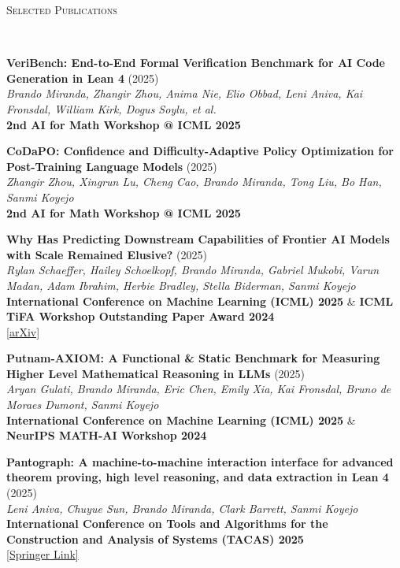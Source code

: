 \documentclass{article}
\newenvironment{changemargin}[2]{%
  \begin{list}{}{%
    \setlength{\topsep}{0pt}%
    \setlength{\leftmargin}{#1}%
    \setlength{\rightmargin}{#2}%
    \setlength{\listparindent}{\parindent}%
    \setlength{\itemindent}{\parindent}%
    \setlength{\parsep}{\parskip}%
  }%
  \item[]}{\end{list}
}
\newcommand{\lineover}{
	\begin{changemargin}{-0.05in}{-0.05in}
		\vspace*{-8pt}
		\hrulefill \\
		\vspace*{-2pt}
	\end{changemargin}
}
\newcommand{\header}[1]{
	\begin{changemargin}{-0.5in}{-0.5in}
		\scshape{#1}\\
  	\lineover
	\end{changemargin}
}
\newenvironment{body} {
	\vspace*{-16pt}
	\begin{changemargin}{-0.25in}{-0.5in}
  }	
	{\end{changemargin}
}
\begin{document}
\header{Selected Publications}
\begin{body}
    \vspace{4pt} %
    
    \vspace{10pt}
    \textbf{VeriBench: End-to-End Formal Verification Benchmark for AI Code Generation in Lean 4} (2025)\\
    \emph{Brando Miranda, Zhangir Zhou, Anima Nie, Elio Obbad, Leni Aniva, Kai Fronsdal, William Kirk, Dogus Soylu, et al.}\\
    \textbf{2nd AI for Math Workshop @ ICML 2025}

    \vspace{10pt}
    \textbf{CoDaPO: Confidence and Difficulty-Adaptive Policy Optimization for Post-Training Language Models} (2025)\\
    \emph{Zhangir Zhou, Xingrun Lu, Cheng Cao, Brando Miranda, Tong Liu, Bo Han, Sanmi Koyejo}\\
    \textbf{2nd AI for Math Workshop @ ICML 2025}

    \vspace{10pt}
    \textbf{Why Has Predicting Downstream Capabilities of Frontier AI Models with Scale Remained Elusive?} (2025)\\
    \emph{Rylan Schaeffer, Hailey Schoelkopf, Brando Miranda, Gabriel Mukobi, Varun Madan, Adam Ibrahim, Herbie Bradley, Stella Biderman, Sanmi Koyejo}\\
    \textbf{International Conference on Machine Learning (ICML) 2025} \& \textbf{ICML TiFA Workshop Outstanding Paper Award 2024}\\
    \href{https://arxiv.org/pdf/2406.04391}{[arXiv]}

    \vspace{10pt}
    \textbf{Putnam-AXIOM: A Functional \& Static Benchmark for Measuring Higher Level Mathematical Reasoning in LLMs} (2025)\\
    \emph{Aryan Gulati, Brando Miranda, Eric Chen, Emily Xia, Kai Fronsdal, Bruno de Moraes Dumont, Sanmi Koyejo}\\
    \textbf{International Conference on Machine Learning (ICML) 2025} \& \textbf{NeurIPS MATH-AI Workshop 2024}

    \vspace{10pt}
    \textbf{Pantograph: A machine-to-machine interaction interface for advanced theorem proving, high level reasoning, and data extraction in Lean 4} (2025)\\
    \emph{Leni Aniva, Chuyue Sun, Brando Miranda, Clark Barrett, Sanmi Koyejo}\\
    \textbf{International Conference on Tools and Algorithms for the Construction and Analysis of Systems (TACAS) 2025}\\
    \href{https://link.springer.com/chapter/10.1007/978-3-031-90643-5_6}{[Springer Link]}


\end{body}
\end{document}
